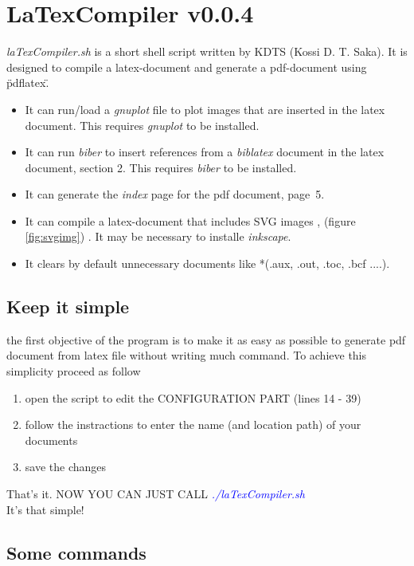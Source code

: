 \documentclass[11pt,a4paper,twoside]{article}
\begin{document}
\section{LaTexCompiler v0.0.4}

	\textit{laTexCompiler.sh} is a short shell script written by KDTS (Kossi D. T. Saka).
	It is designed to compile a latex-document and generate a pdf-document using \"pdflatex\".\newline

	\begin{itemize}
		\item It can run/load a \textit{gnuplot} file to plot images that are inserted in the latex document. This requires \textit{gnuplot} to be installed.
		\item It can run \textit{biber} to insert references from a \textit{biblatex} document in the latex document, section 2. This requires \textit{biber} to be installed.
		\item It can generate the \textit{index} page for the pdf document, page~5.
		\item It can compile a latex-document that includes SVG images \cite{svgInLatex}, (figure \ref{fig:svgimg}) . It may be necessary to installe \textit{inkscape}.
		\item It clears by default unnecessary documents like *(.aux, .out, .toc, .bcf ....).
	\end{itemize}


	\subsection{Keep it simple}
		the first objective of the program is to make it as easy as possible to generate pdf document from latex file without writing much command. 
		To achieve this simplicity proceed as follow 
		\begin{enumerate}
			\item open the script to edit the CONFIGURATION PART (lines 14 - 39)
			\item follow the instractions to enter the name (and location path)  of your documents
			\item save the changes
		\end{enumerate}
		That's it. NOW YOU CAN JUST CALL \textcolor{blue}{\textit{./laTexCompiler.sh}}\\
		 It's that simple!

	\subsection{Some commands}
\end{document}
